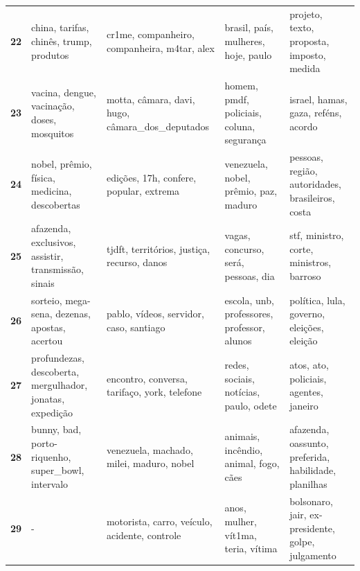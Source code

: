 \begin{xltabular}{\textwidth}{@{}l >{\RaggedRight\arraybackslash}X >{\RaggedRight\arraybackslash}X >{\RaggedRight\arraybackslash}X >{\RaggedRight\arraybackslash}X@{}}
    \textbf{22} & china, tarifas, chinês, trump, produtos & cr1me, companheiro, companheira, m4tar, alex & brasil, país, mulheres, hoje, paulo & projeto, texto, proposta, imposto, medida \\
    \textbf{23} & vacina, dengue, vacinação, doses, mosquitos & motta, câmara, davi, hugo, câmara\_dos\_deputados & homem, pmdf, policiais, coluna, segurança & israel, hamas, gaza, reféns, acordo \\
    \textbf{24} & nobel, prêmio, física, medicina, descobertas & edições, 17h, confere, popular, extrema & venezuela, nobel, prêmio, paz, maduro & pessoas, região, autoridades, brasileiros, costa \\
    \textbf{25} & afazenda, exclusivos, assistir, transmissão, sinais & tjdft, territórios, justiça, recurso, danos & vagas, concurso, será, pessoas, dia & stf, ministro, corte, ministros, barroso \\
    \textbf{26} & sorteio, mega-sena, dezenas, apostas, acertou & pablo, vídeos, servidor, caso, santiago & escola, unb, professores, professor, alunos & política, lula, governo, eleições, eleição \\
    \textbf{27} & profundezas, descoberta, mergulhador, jonatas, expedição & encontro, conversa, tarifaço, york, telefone & redes, sociais, notícias, paulo, odete & atos, ato, policiais, agentes, janeiro \\
    \textbf{28} & bunny, bad, porto-riquenho, super\_bowl, intervalo & venezuela, machado, milei, maduro, nobel & animais, incêndio, animal, fogo, cães & afazenda, oassunto, preferida, habilidade, planilhas \\
    \textbf{29} & - & motorista, carro, veículo, acidente, controle & anos, mulher, vít1ma, teria, vítima & bolsonaro, jair, ex-presidente, golpe, julgamento \\
\end{xltabular}
\endgroup
